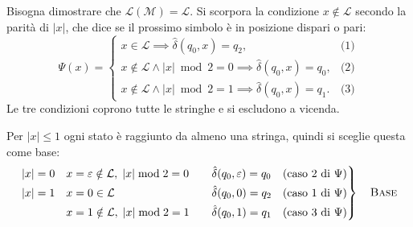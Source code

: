 \documentclass[a4paper, 11pt, oneside]{book}
\theoremstyle{formale}
\begin{document}
    Bisogna dimostrare che $\mathcal{L}(\mathcal{M}) = \mathcal{L}$. Si scorpora la
    condizione $x \notin \mathcal{L}$ secondo la parit\`a di $|x|$, che dice se il
    prossimo simbolo \`e in posizione dispari o pari:
    \begin{equation*}
        \Psi(x) =
        \begin{cases}
            x \in \mathcal{L} \implies \hat{\delta}(q_0, x) = q_2,
                & \text{(1)} \\
            x \notin \mathcal{L} \land |x| \bmod 2 = 0 \implies \hat{\delta}(q_0, x) = q_0,
                & \text{(2)} \\
            x \notin \mathcal{L} \land |x| \bmod 2 = 1 \implies \hat{\delta}(q_0, x) = q_1.
                & \text{(3)}
        \end{cases}
    \end{equation*}
    Le tre condizioni coprono tutte le stringhe e si escludono a vicenda.

    Per $|x| \leq 1$ ogni stato \`e raggiunto da almeno una stringa, quindi si sceglie
    questa come base:
    \begin{equation*}
        \left.
        \begin{alignedat}{3}
            |x| = 0 \quad & x = \varepsilon \notin \mathcal{L},\; |x| \bmod 2 = 0 & \qquad
                & \hat{\delta}(q_0, \varepsilon) = q_0
                &\quad \text{(caso 2 di $\Psi$)} \\
            |x| = 1 \quad & x = 0 \in \mathcal{L} &
                & \hat{\delta}(q_0, 0) = q_2
                &\quad \text{(caso 1 di $\Psi$)} \\
            & x = 1 \notin \mathcal{L},\; |x| \bmod 2 = 1 &
                & \hat{\delta}(q_0, 1) = q_1
                &\quad \text{(caso 3 di $\Psi$)}
        \end{alignedat}
        \right\}
        \quad \text{\textsc{Base}}
    \end{equation*}
\end{document}
